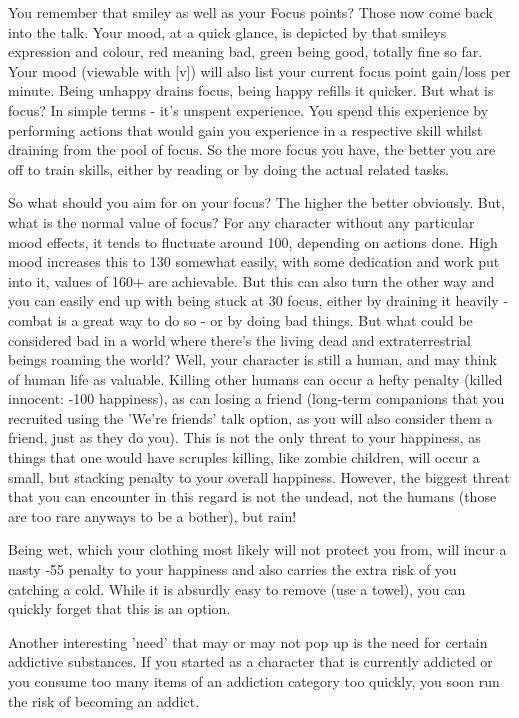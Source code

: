 \documentclass[11pt]{report}
\begin{document}
You remember that smiley as well as your Focus points? Those now come back into the talk. Your mood, at a quick glance, is depicted by that smileys expression and colour, red meaning bad, green being good, totally fine so far. Your mood (viewable with [v]) will also list your current focus point gain/loss per minute. Being unhappy drains focus, being happy refills it quicker. But what is focus? In simple terms - it's unspent experience. You spend this experience by performing actions that would gain you experience in a respective skill whilst draining from the pool of focus. So the more focus you have, the better you are off to train skills, either by reading or by doing the actual related tasks.

So what should you aim for on your focus? The higher the better obviously. But, what is the normal value of focus? For any character without any particular mood effects, it tends to fluctuate around 100, depending on actions done. High mood increases this to 130 somewhat easily, with some dedication and work put into it, values of 160+ are achievable. But this can also turn the other way and you can easily end up with being stuck at 30 focus, either by draining it heavily - combat is a great way to do so - or by doing bad things. But what could be considered bad in a world where there's the living dead and extraterrestrial beings roaming the world? Well, your character is still a human, and may think of human life as valuable. Killing other humans can occur a hefty penalty (killed innocent: -100 happiness), as can losing a friend (long-term companions that you recruited using the 'We're friends' talk option, as you will also consider them a friend, just as they do you). This is not the only threat to your happiness, as things that one would have scruples killing, like zombie children, will occur a small, but stacking penalty to your overall happiness. However, the biggest threat that you can encounter in this regard is not the undead, not the humans (those are too rare anyways to be a bother), but rain!

Being wet, which your clothing most likely will not protect you from, will incur a nasty -55 penalty to your happiness and also carries the extra risk of you catching a cold. While it is absurdly easy to remove (use a towel), you can quickly forget that this is an option.

Another interesting 'need' that may or may not pop up is the need for certain addictive substances. If you started as a character that is currently addicted or you consume too many items of an addiction category too quickly, you soon run the risk of becoming an addict.
\end{document}
